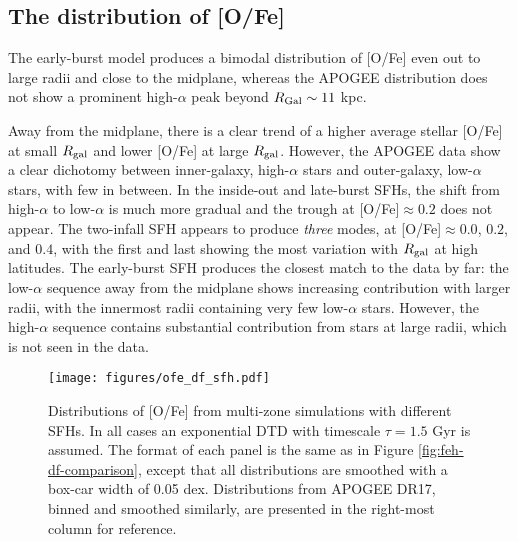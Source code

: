 \documentclass[twocolumn,twocolappendix,linenumbers]{aastex631}
\begin{document}

\subsection{The distribution of [O/Fe]}

The early-burst model produces a bimodal distribution of [O/Fe] even out to large radii and close to the midplane, whereas the APOGEE distribution does not show a prominent high-$\alpha$ peak beyond $R_{\rm{Gal}}\sim11$ kpc.

Away from the midplane, there is a clear trend of a higher average stellar [O/Fe] at small $R_{\rm gal}$ and lower [O/Fe] at large $R_{\rm gal}$. However, the APOGEE data show a clear dichotomy between inner-galaxy, high-$\alpha$ stars and outer-galaxy, low-$\alpha$ stars, with few in between. In the inside-out and late-burst SFHs, the shift from high-$\alpha$ to low-$\alpha$ is much more gradual and the trough at [O/Fe]$\approx0.2$ does not appear. The two-infall SFH appears to produce \textit{three} modes, at [O/Fe]$\approx 0.0$, $0.2$, and $0.4$, with the first and last showing the most variation with $R_{\rm gal}$ at high latitudes. The early-burst SFH produces the closest match to the data by far: the low-$\alpha$ sequence away from the midplane shows increasing contribution with larger radii, with the innermost radii containing very few low-$\alpha$ stars. However, the high-$\alpha$ sequence contains substantial contribution from stars at large radii, which is not seen in the data.

\begin{figure*}
    \centering
    \texttt{[image: figures/ofe\_df\_sfh.pdf]}
    \caption{Distributions of [O/Fe] from multi-zone simulations with different SFHs. In all cases an exponential DTD with timescale $\tau=1.5$ Gyr is assumed. The format of each panel is the same as in Figure \ref{fig:feh-df-comparison}, except that all distributions are smoothed with a box-car width of 0.05 dex. Distributions from APOGEE DR17, binned and smoothed similarly, are presented in the right-most column for reference.}
    \label{fig:ofe-df-sfh}
\end{figure*}
\end{document}
